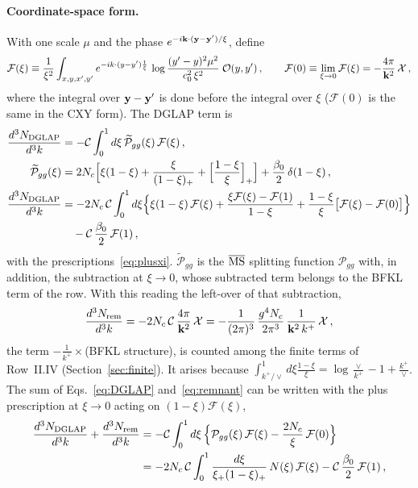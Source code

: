 \paragraph{Coordinate-space form.} With one scale $\mu$ and the phase $e^{-i\mathbf{k}\cdot(\mathbf{y}-\mathbf{y}')/\xi}$, define
\begin{align}\label{eq:dg_F}
\mathcal F(\xi)\equiv\frac{1}{\xi^2}\int_{x,y,x',y'}e^{-ik\cdot(y-y')\frac1\xi}\,\log\frac{(y'-y)^2\mu^2}{c_0^2\,\xi^2}\;\mathcal O(y,y')\,,\qquad
\mathcal F(0)\equiv\lim_{\xi\to0}\mathcal F(\xi)=-\frac{4\pi}{\mathbf{k}^2}\,\mathcal X\,,
\end{align}
where the integral over $\mathbf{y}-\mathbf{y}'$ is done before the integral over $\xi$ ($\mathcal F(0)$ is the same in the CXY form). The DGLAP term is
\begin{align}\label{eq:DGLAP}
\frac{d^3N_{\rm DGLAP}}{d^3k}&=-\mathcal C\int_0^1d\xi\,\widetilde{\mathcal P}_{gg}(\xi)\,\mathcal F(\xi)\,,\notag\\
\widetilde{\mathcal P}_{gg}(\xi)&=2N_c\Big[\xi(1-\xi)+\frac{\xi}{(1-\xi)_+}+\Big[\frac{1-\xi}{\xi}\Big]_+\Big]+\frac{\beta_0}{2}\,\delta(1-\xi)\,,\notag\\
\frac{d^3N_{\rm DGLAP}}{d^3k}&=-2N_c\,\mathcal C\int_0^1d\xi\Big\{\xi(1-\xi)\,\mathcal F(\xi)+\frac{\xi\mathcal F(\xi)-\mathcal F(1)}{1-\xi}+\frac{1-\xi}{\xi}\big[\mathcal F(\xi)-\mathcal F(0)\big]\Big\}\notag\\&\quad-\mathcal C\,\frac{\beta_0}{2}\,\mathcal F(1)\,,
\end{align}
with the prescriptions~\eqref{eq:plusxi}. $\widetilde{\mathcal P}_{gg}$ is the $\overline{\rm MS}$ splitting function $\mathcal P_{gg}$ with, in addition, the subtraction at $\xi\to0$, whose subtracted term belongs to the BFKL term of the row. With this reading the left-over of that subtraction,
\begin{align}\label{eq:remnant}
\frac{d^3N_{\rm rem}}{d^3k}=-2N_c\,\mathcal C\,\frac{4\pi}{\mathbf{k}^2}\,\mathcal X=-\frac{1}{(2\pi)^3}\,\frac{g^4N_c}{2\pi^3}\,\frac{1}{\mathbf{k}^2\,k^+}\,\mathcal X\,,
\end{align}
the term $-\frac{1}{k^+}\times$(BFKL structure), is counted among the finite terms of Row~II.IV (Section~\ref{sec:finite}). It arises because $\int_{k^+/\vee}^1d\xi\frac{1-\xi}{\xi}=\log\frac{\vee}{k^+}-1+\frac{k^+}{\vee}$. The sum of Eqs.~\eqref{eq:DGLAP} and~\eqref{eq:remnant} can be written with the plus prescription at $\xi\to0$ acting on $(1-\xi)\mathcal F(\xi)$,
\begin{align}\label{eq:DGLAPdoubleplus}
\frac{d^3N_{\rm DGLAP}}{d^3k}+\frac{d^3N_{\rm rem}}{d^3k}&=-\mathcal C\int_0^1d\xi\,\Big\{\mathcal P_{gg}(\xi)\,\mathcal F(\xi)-\frac{2N_c}{\xi}\,\mathcal F(0)\Big\}\notag\\
&=-2N_c\,\mathcal C\int_0^1\frac{d\xi}{\xi_+(1-\xi)_+}\,N(\xi)\,\mathcal F(\xi)-\mathcal C\,\frac{\beta_0}{2}\,\mathcal F(1)\,,
\end{align}
